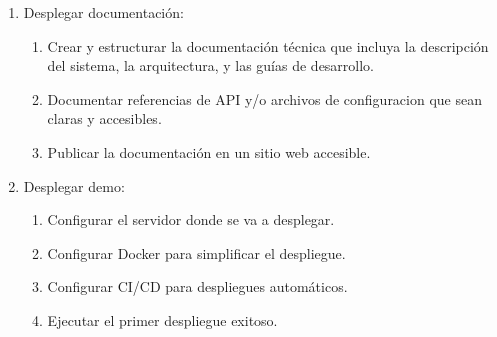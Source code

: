 \begin{enumerate}[label=\arabic*., itemindent=*, leftmargin=*]
    \item Desplegar documentación:
          \begin{enumerate}[label=\arabic{enumi}.\arabic*., leftmargin=*]
              \item Crear y estructurar la documentación técnica que incluya la descripción del sistema, la arquitectura, y las guías de desarrollo.
              \item Documentar referencias de API y/o archivos de configuracion que sean claras y accesibles.
              \item Publicar la documentación en un sitio web accesible.
          \end{enumerate}

    \item Desplegar demo:
          \begin{enumerate}[label=\arabic{enumi}.\arabic*., leftmargin=*]
              \item Configurar el servidor donde se va a desplegar.
              \item Configurar Docker para simplificar el despliegue.
              \item Configurar CI/CD para despliegues automáticos.
              \item Ejecutar el primer despliegue exitoso.
          \end{enumerate}
\end{enumerate}
